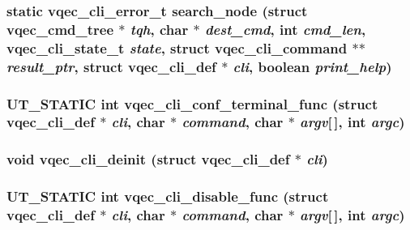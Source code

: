 \subsubsection{\setlength{\rightskip}{0pt plus 5cm}static \bf{vqec\_\-cli\_\-error\_\-t} search\_\-node (struct vqec\_\-cmd\_\-tree $\ast$ {\em tqh}, char $\ast$ {\em dest\_\-cmd}, int {\em cmd\_\-len}, \bf{vqec\_\-cli\_\-state\_\-t} {\em state}, struct \bf{vqec\_\-cli\_\-command} $\ast$$\ast$ {\em result\_\-ptr}, struct \bf{vqec\_\-cli\_\-def} $\ast$ {\em cli}, boolean {\em print\_\-help})\hspace{0.3cm}{\tt  [static]}}\label{vqec__cli_8c_247b97c1ca4d45f59e8bcf2f00e5dbfd}


\subsubsection{\setlength{\rightskip}{0pt plus 5cm}UT\_\-STATIC int vqec\_\-cli\_\-conf\_\-terminal\_\-func (struct \bf{vqec\_\-cli\_\-def} $\ast$ {\em cli}, char $\ast$ {\em command}, char $\ast$ {\em argv}[$\,$], int {\em argc})}\label{vqec__cli_8c_10b6d9b8f3b9c69e9918d2d8b88dcdac}


\subsubsection{\setlength{\rightskip}{0pt plus 5cm}void vqec\_\-cli\_\-deinit (struct \bf{vqec\_\-cli\_\-def} $\ast$ {\em cli})}\label{vqec__cli_8c_6bfd13e12cd403734f8189475e286867}


\subsubsection{\setlength{\rightskip}{0pt plus 5cm}UT\_\-STATIC int vqec\_\-cli\_\-disable\_\-func (struct \bf{vqec\_\-cli\_\-def} $\ast$ {\em cli}, char $\ast$ {\em command}, char $\ast$ {\em argv}[$\,$], int {\em argc})}\label{vqec__cli_8c_6e5e659211e6292557bdf2389077cbdc}


